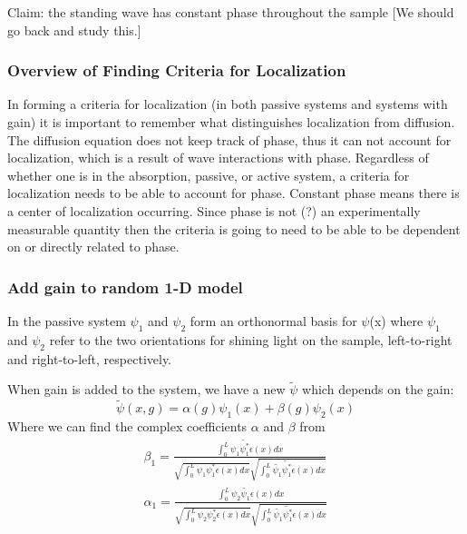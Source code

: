 Claim: the standing wave has constant phase throughout the sample %
[We should go back and study this.]

\subsubsection{Overview of Finding Criteria for Localization}

In forming a criteria for localization (in both passive systems and systems with gain) it is important to remember what distinguishes localization from diffusion.  The diffusion equation does not keep track of phase, thus it can not account for localization, which is a result of wave interactions with phase.  Regardless of whether one is in the absorption, passive, or active system, a criteria for localization needs to be able to account for phase.  Constant phase means there is a center of localization occurring.  Since phase is not (?) an experimentally measurable quantity then the criteria is going to need to be able to be dependent on or directly related to phase.

\subsubsection{Add gain to random 1-D model}

In the passive system $ \psi _1 $ and $ \psi _2 $ form an orthonormal basis for $ \psi $(x) where $ \psi _1 $ and $ \psi _2 $ refer to the two orientations for shining light on the sample, left-to-right and right-to-left, respectively.

When gain is added to the system, we have a new $\tilde{\psi}$ which depends on the gain:
\begin{equation}
\tilde{\psi}(x,g) = \alpha(g)  \psi _1(x) + \beta(g)  \psi _2(x)
\end{equation}
Where we can find the complex coefficients
$\alpha$ and $\beta$ from
\begin{equation}  %
\begin{gathered}
\beta _1 = \frac{\int _0 ^L \psi _1 \tilde{\psi _1 ^*} \epsilon(x) dx}
{\sqrt{\int _0 ^L \psi _1 \psi _1 ^* \epsilon(x) dx}
 \sqrt{\int _0 ^L \tilde{\psi _1} \tilde{\psi _1 ^*} \epsilon(x) dx}} \\
\alpha _1 = \frac{\int _0 ^L \psi _2 \tilde{\psi _1} \epsilon(x) dx}
{\sqrt{\int _0 ^L \psi _2 \psi _2 ^* \epsilon(x) dx}
 \sqrt{\int _0 ^L \tilde{\psi _1} \tilde{\psi _1 ^*} \epsilon(x) dx}}
\end{gathered}
\end{equation}

